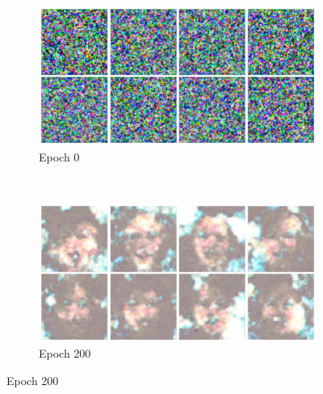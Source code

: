 \begin{figure}
    \centering
    \begin{subfigure}[b]{0.45\textwidth}
        \includegraphics[width=\textwidth]{fig/dcgan/ffhq/epoch0}
        \caption{Epoch 0}
    \end{subfigure}
    ~
    \begin{subfigure}[b]{0.45\textwidth}
        \includegraphics[width=\textwidth]{fig/dcgan/ffhq/epoch200}
        \caption{Epoch 200}
    \end{subfigure}


\end{figure}
